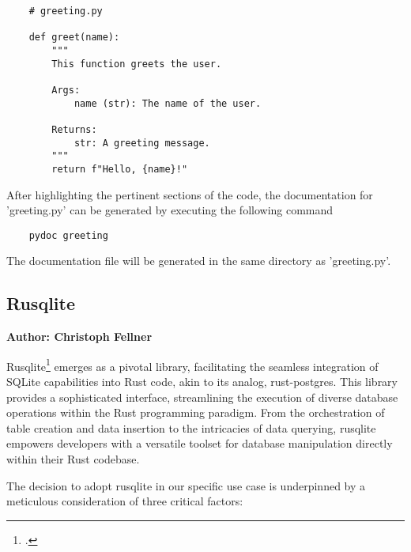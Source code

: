 \begin{verbatim} 
	# greeting.py
	 
	def greet(name):
    	"""
    	This function greets the user.
    
    	Args:
        	name (str): The name of the user.
        
    	Returns:
        	str: A greeting message.
    	"""
    	return f"Hello, {name}!"
\end{verbatim}

After highlighting the pertinent sections of the code, the documentation for 'greeting.py' can be generated by executing the following command 

\begin{verbatim}  
	pydoc greeting
\end{verbatim}

The documentation file will be generated in the same directory as 'greeting.py'.


\subsection{Rusqlite}
\textbf{Author: Christoph Fellner}

Rusqlite\footcite{rusqlite} emerges as a pivotal library, facilitating the seamless integration of SQLite capabilities into Rust code, akin to its analog, 
rust-postgres. This library provides a sophisticated interface, streamlining the execution of diverse database operations within the Rust programming paradigm. 
From the orchestration of table creation and data insertion to the intricacies of data querying, rusqlite empowers developers with a versatile toolset for 
database manipulation directly within their Rust codebase.

The decision to adopt rusqlite in our specific use case is underpinned by a meticulous consideration of three critical factors:


